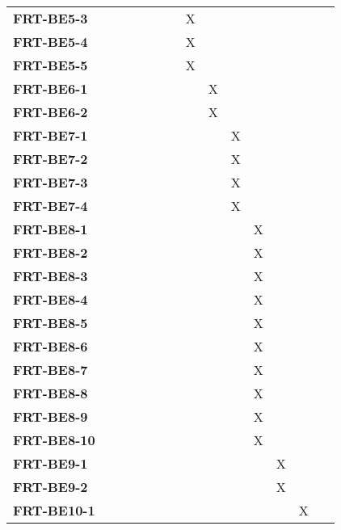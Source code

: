 \documentclass[12pt, titlepage]{article}
\begin{document}
\begin{table}[H]
\begin{adjustbox}{max width=0.7\paperwidth}
\begin{tabular}{l|ccccccccccc}
        \textbf{FRT-BE5-3}  & ~ & ~ & ~ & ~ & X & ~ & ~ & ~ & ~ & ~ & ~\\
        \textbf{FRT-BE5-4}  & ~ & ~ & ~ & ~ & X & ~ & ~ & ~ & ~ & ~ & ~\\
        \textbf{FRT-BE5-5}  & ~ & ~ & ~ & ~ & X & ~ & ~ & ~ & ~ & ~ & ~\\
        \textbf{FRT-BE6-1}  & ~ & ~ & ~ & ~ & ~ & X & ~ & ~ & ~ & ~ & ~\\
        \textbf{FRT-BE6-2}  & ~ & ~ & ~ & ~ & ~ & X & ~ & ~ & ~ & ~ & ~\\
        \textbf{FRT-BE7-1}  & ~ & ~ & ~ & ~ & ~ & ~ & X & ~ & ~ & ~ & ~\\
        \textbf{FRT-BE7-2}  & ~ & ~ & ~ & ~ & ~ & ~ & X & ~ & ~ & ~ & ~\\
        \textbf{FRT-BE7-3}  & ~ & ~ & ~ & ~ & ~ & ~ & X & ~ & ~ & ~ & ~\\
        \textbf{FRT-BE7-4}  & ~ & ~ & ~ & ~ & ~ & ~ & X & ~ & ~ & ~ & ~\\
        \textbf{FRT-BE8-1}  & ~ & ~ & ~ & ~ & ~ & ~ & ~ & X & ~ & ~ & ~\\
        \textbf{FRT-BE8-2}  & ~ & ~ & ~ & ~ & ~ & ~ & ~ & X & ~ & ~ & ~\\
        \textbf{FRT-BE8-3}  & ~ & ~ & ~ & ~ & ~ & ~ & ~ & X & ~ & ~ & ~\\
        \textbf{FRT-BE8-4}  & ~ & ~ & ~ & ~ & ~ & ~ & ~ & X & ~ & ~ & ~\\
        \textbf{FRT-BE8-5}  & ~ & ~ & ~ & ~ & ~ & ~ & ~ & X & ~ & ~ & ~\\
        \textbf{FRT-BE8-6}  & ~ & ~ & ~ & ~ & ~ & ~ & ~ & X & ~ & ~ & ~\\
        \textbf{FRT-BE8-7}  & ~ & ~ & ~ & ~ & ~ & ~ & ~ & X & ~ & ~ & ~\\
        \textbf{FRT-BE8-8}  & ~ & ~ & ~ & ~ & ~ & ~ & ~ & X & ~ & ~ & ~\\
        \textbf{FRT-BE8-9}  & ~ & ~ & ~ & ~ & ~ & ~ & ~ & X & ~ & ~ & ~\\
        \textbf{FRT-BE8-10} & ~ & ~ & ~ & ~ & ~ & ~ & ~ & X & ~ & ~ & ~\\
        \textbf{FRT-BE9-1}  & ~ & ~ & ~ & ~ & ~ & ~ & ~ & ~ & X & ~ & ~\\
        \textbf{FRT-BE9-2}  & ~ & ~ & ~ & ~ & ~ & ~ & ~ & ~ & X & ~ & ~\\
        \textbf{FRT-BE10-1} & ~ & ~ & ~ & ~ & ~ & ~ & ~ & ~ & ~ & X & ~\\
    \end{tabular}
    \end{adjustbox}
    \label{Traceability Matrix: Functional Requirement}
\end{table}
\end{document}
